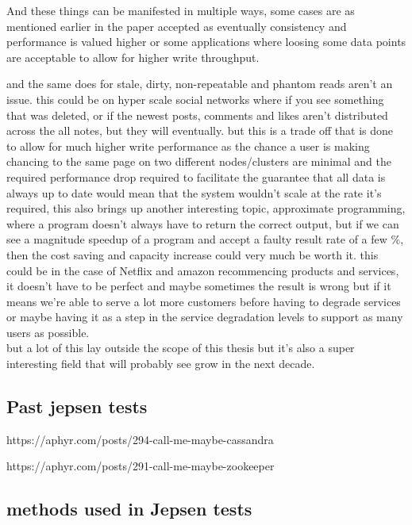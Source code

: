 \documentclass[a4paper,10pt,titlepage]{report}
\begin{document}
And these things can be manifested in multiple ways, some cases are as mentioned earlier in the paper accepted as eventually consistency and performance is valued higher or some applications where loosing some data points are acceptable to allow for higher write throughput.

and the same does for stale, dirty, non-repeatable and phantom reads aren't an issue. this could be on hyper scale social networks where if you see something that was deleted, or if the newest posts, comments and likes aren't distributed across the all notes, but they will eventually. but this is a trade off that is done to allow for much higher write performance as the chance a user is making chancing to the same page on two different nodes/clusters are minimal and the required performance drop required to facilitate the guarantee that all data is always up to date would mean that the system wouldn't scale at the rate it's required, this also brings up another interesting topic, approximate programming, where a program doesn't always have to return the correct output, but if we can see a magnitude speedup of a program and accept a faulty result rate of a few \%, then the cost saving and capacity increase could very much be worth it. this could be in the case of Netflix and amazon recommencing products and services, it doesn't have to be perfect and maybe sometimes the result is wrong but if it means we're able to serve a lot more customers before having to degrade services or maybe having it as a step in the service degradation levels to support as many users as possible. \\

but a lot of this lay outside the scope of this thesis but it's also a super interesting field that will probably see grow in the next decade.





\subsection{Past jepsen tests}

https://aphyr.com/posts/294-call-me-maybe-cassandra


https://aphyr.com/posts/291-call-me-maybe-zookeeper







\subsection{methods used in Jepsen tests}
\end{document}
